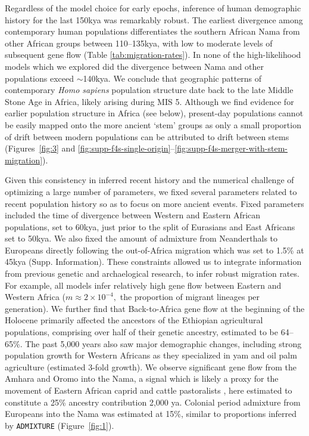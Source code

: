 \documentclass[]{article}
\begin{document}
Regardless of the model choice for early epochs, inference of human demographic
history for the last 150kya was remarkably robust. The earliest divergence among
contemporary human populations differentiates the southern African Nama from
other African groups between 110--135kya, with low to moderate levels of
subsequent gene flow (Table \ref{tab:migration-rates}). In none of the
high-likelihood models which we explored did the divergence between Nama and
other populations exceed $\sim$140kya. 
We conclude that geographic patterns of contemporary \emph{Homo sapiens} population structure
date back to the late Middle Stone Age in Africa, likely arising during MIS 5.
Although we find evidence for earlier population structure in Africa (see
below), present-day populations cannot be easily mapped onto the more ancient
`stem' groups as only a small proportion of drift between modern populations can
be attributed to drift between stems (Figures~\ref{fig:3} and
\ref{fig:supp-f4s-single-origin}--\ref{fig:supp-f4s-merger-with-stem-migration}). 

Given this consistency in inferred recent history and the numerical challenge
of optimizing a large number of parameters, we fixed several parameters related
to recent population history so as to focus on more ancient events. 
Fixed parameters included
the time of divergence between Western and Eastern African populations,
set to 60kya, just prior to the split of Eurasians and East Africans set to 50kya. 
We also fixed the amount of admixture from Neanderthals to Europeans directly
following the out-of-Africa migration which was set to 1.5\% at 45kya (Supp. Information). These constraints allowed us to integrate information from previous genetic and archaelogical research,
to infer robust migration rates. For example, all models infer relatively high gene flow between Eastern and Western Africa
($m\approx2\times10^{-4},$ the proportion of migrant lineages per generation). We further find that Back-to-Africa gene flow at the beginning of the Holocene primarily
affected the ancestors of the Ethiopian agricultural populations, comprising
over half of their genetic ancestry, estimated to be 64--65\%. The past 5,000
years also saw major demographic changes, including strong population growth
for Western Africans as they specialized in yam and oil palm agriculture
(estimated 3-fold growth). We observe significant gene flow from the Amhara and
Oromo into the Nama, a signal which is likely a proxy for the movement of
Eastern African caprid and cattle pastoralists
\citep{Henn2008-xo,Breton2014-xb}, here estimated to constitute a 25\% ancestry
contribution 2,000 ya. Colonial period admixture from Europeans into the Nama
was estimated at 15\%, similar to proportions inferred by \texttt{ADMIXTURE} (Figure~\ref{fig:1}).
\end{document}
